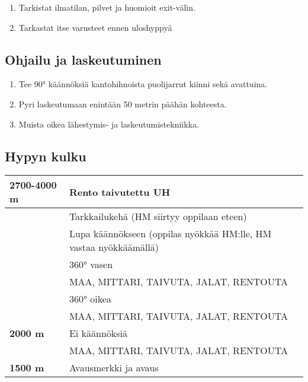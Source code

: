 \begin{multicols}{2}
\begin{enumerate}[label=\bfseries \arabic*)]
\item  Tarkistat ilmatilan, pilvet ja huomioit exit-välin. 
\item  Tarkastat itse varusteet ennen uloshyppyä 
\end{enumerate}
\subsection{ Ohjailu ja laskeutuminen }
\label{nova-alkeiskoulutuksen-suoritukset-ohjailu-ja-laskeutuminen}

\begin{enumerate}[label=\bfseries \arabic*)]
\item  Tee 90° käännöksiä kantohihnoista puolijarrut kiinni sekä avattuina. 
\item  Pyri laskeutumaan enintään 50 metrin päähän kohteesta. 
\item  Muista oikea lähestymis- ja laskeutumistekniikka. 
\end{enumerate}
\subsection{ Hypyn kulku }
\label{nova-alkeiskoulutuksen-suoritukset-hypyn-kulku}

\begin{tabular}[]{|l|p{4.7cm}|}
\hline
 \textbf{2700-4000 m} &  Rento taivutettu UH
\\ \hline
  &  Tarkkailukehä (HM siirtyy oppilaan eteen)
\\ \hline
  &  Lupa käännökseen (oppilas nyökkää HM:lle, HM vastaa nyökkäämällä)
\\ \hline
  &  360° vasen
\\ \hline
  &  MAA, MITTARI, TAIVUTA, JALAT, RENTOUTA
\\ \hline
  &  360° oikea
\\ \hline
  &  MAA, MITTARI, TAIVUTA, JALAT, RENTOUTA
\\ \hline
 \textbf{2000 m} &  Ei käännöksiä
\\ \hline
  &  MAA, MITTARI, TAIVUTA, JALAT, RENTOUTA
\\ \hline
 \textbf{1500 m} &  Avausmerkki ja avaus
\\ \hline
\end{tabular}

\end{multicols}\pagebreak\begin{multicols}{2} 


\end{multicols}
